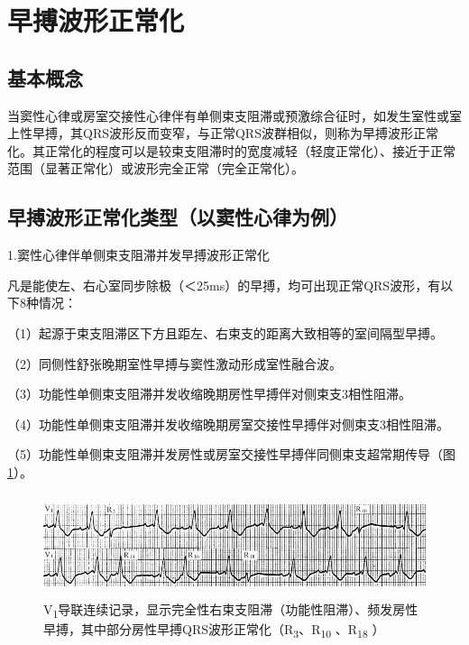 \protect\hypertarget{text00018.htmlux5cux23subid163}{}{}

\section{早搏波形正常化}

\protect\hypertarget{text00018.htmlux5cux23subid164}{}{}

\subsection{基本概念}

当窦性心律或房室交接性心律伴有单侧束支阻滞或预激综合征时，如发生室性或室上性早搏，其QRS波形反而变窄，与正常QRS波群相似，则称为早搏波形正常化。其正常化的程度可以是较束支阻滞时的宽度减轻（轻度正常化）、接近于正常范围（显著正常化）或波形完全正常（完全正常化）。

\protect\hypertarget{text00018.htmlux5cux23subid165}{}{}

\subsection{早搏波形正常化类型（以窦性心律为例）}

1.窦性心律伴单侧束支阻滞并发早搏波形正常化

凡是能使左、右心室同步除极（＜25ms）的早搏，均可出现正常QRS波形，有以下8种情况：

（1）起源于束支阻滞区下方且距左、右束支的距离大致相等的室间隔型早搏。

（2）同侧性舒张晚期室性早搏与窦性激动形成室性融合波。

（3）功能性单侧束支阻滞并发收缩晚期房性早搏伴对侧束支3相性阻滞。

（4）功能性单侧束支阻滞并发收缩晚期房室交接性早搏伴对侧束支3相性阻滞。

（5）功能性单侧束支阻滞并发房性或房室交接性早搏伴同侧束支超常期传导（图\ref{fig11-30}）。

\begin{figure}[!htbp]
 \centering
 \includegraphics[width=5.58333in,height=1.1875in]{./images/Image00193.jpg}
 \captionsetup{justification=centering}
 \caption{V\textsubscript{1}导联连续记录，显示完全性右束支阻滞（功能性阻滞）、频发房性早搏，其中部分房性早搏QRS波形正常化（R\textsubscript{3}、R\textsubscript{10} 、R\textsubscript{18} ）}
 \label{fig11-30}
  \end{figure} 


